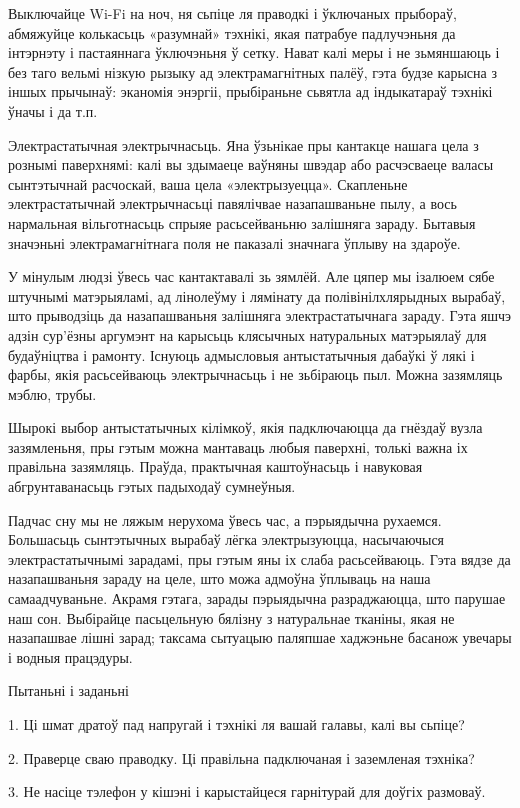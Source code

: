 Выключайце Wi-Fi на ноч, ня сьпіце ля праводкі і ўключаных прыбораў, абмяжуйце колькасьць «разумнай» тэхнікі, якая патрабуе падлучэньня да інтэрнэту і пастаяннага ўключэньня ў сетку. Нават калі меры і не зьмяншаюць і без таго вельмі нізкую рызыку ад электрамагнітных палёў, гэта будзе карысна з іншых прычынаў: эканомія энэргіі, прыбіраньне сьвятла ад індыкатараў тэхнікі ўначы і да т.п.

Электрастатычная электрычнасьць. Яна ўзьнікае пры кантакце нашага цела з рознымі паверхнямі: калі вы здымаеце ваўняны швэдар або расчэсваеце валасы сынтэтычнай расчоскай, ваша цела «электрызуецца». Скапленьне электрастатычнай электрычнасьці павялічвае назапашваньне пылу, а вось нармальная вільготнасьць спрыяе расьсейваньню залішняга зараду. Бытавыя значэньні электрамагнітнага поля не паказалі значнага ўплыву на здароўе.

У мінулым людзі ўвесь час кантактавалі зь зямлёй. Але цяпер мы ізалюем сябе штучнымі матэрыяламі, ад лінолеўму і лямінату да полівінілхлярыдных вырабаў, што прыводзіць да назапашваньня залішняга электрастатычнага зараду. Гэта яшчэ адзін сур'ёзны аргумэнт на карысьць клясычных натуральных матэрыялаў для будаўніцтва і рамонту. Існуюць адмысловыя антыстатычныя дабаўкі ў лякі і фарбы, якія расьсейваюць электрычнасьць і не зьбіраюць пыл. Можна зазямляць мэблю, трубы.

Шырокі выбор антыстатычных кілімкоў, якія падключаюцца да гнёздаў вузла зазямленьня, пры гэтым можна мантаваць любыя паверхні, толькі важна іх правільна зазямляць. Праўда, практычная каштоўнасьць і навуковая абгрунтаванасьць гэтых падыходаў сумнеўныя.

Падчас сну мы не ляжым нерухома ўвесь час, а пэрыядычна рухаемся. Большасьць сынтэтычных вырабаў лёгка электрызуюцца, насычаючыся электрастатычнымі зарадамі, пры гэтым яны іх слаба расьсейваюць. Гэта вядзе да назапашваньня зараду на целе, што можа адмоўна ўплываць на наша самаадчуваньне. Акрамя гэтага, зарады пэрыядычна разраджаюцца, што парушае наш сон. Выбірайце пасьцельную бялізну з натуральнае тканіны, якая не назапашвае лішні зарад; таксама сытуацыю паляпшае хаджэньне басанож увечары і водныя працэдуры.

Пытаньні і заданьні

1. Ці шмат дратоў пад напругай і тэхнікі ля вашай галавы, калі вы сьпіце?

2. Праверце сваю праводку. Ці правільна падключаная і заземленая тэхніка?

3. Не насіце тэлефон у кішэні і карыстайцеся гарнітурай для доўгіх размоваў.


